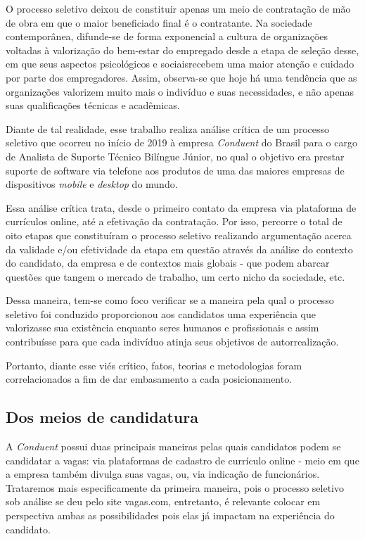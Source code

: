 \documentclass[12pt]{article}
\begin{document}
O processo seletivo deixou de constituir apenas um meio de contratação de mão de obra em que o maior beneficiado final é o contratante. Na sociedade contemporânea, difunde-se de forma exponencial a cultura de organizações voltadas à valorização do bem-estar do empregado desde a etapa de seleção desse, em que seus aspectos psicológicos e sociaisrecebem uma maior atenção e cuidado por parte dos empregadores. Assim, observa-se que hoje há uma tendência que as organizações valorizem muito mais o indivíduo e suas necessidades, e não apenas suas qualificações técnicas e acadêmicas.

Diante de tal realidade, esse trabalho realiza análise crítica de um processo seletivo que ocorreu no início de 2019 à empresa \emph{Conduent} do Brasil para o cargo de Analista de Suporte Técnico Bilíngue Júnior, no qual o objetivo era prestar suporte de software via telefone aos produtos de uma das maiores empresas de dispositivos \emph{mobile} e \emph{desktop} do mundo.

Essa análise crítica trata, desde o primeiro contato da empresa via plataforma de currículos online, até a efetivação da contratação. Por isso, percorre o total de oito etapas que constituíram o processo seletivo realizando argumentação acerca da validade e/ou efetividade da etapa em questão através da análise do contexto do candidato, da empresa e de contextos mais globais - que podem abarcar questões que tangem o mercado de trabalho, um certo nicho da sociedade, etc.

Dessa maneira, tem-se como foco verificar se a maneira pela qual o processo seletivo foi conduzido proporcionou aos candidatos uma experiência que valorizasse sua existência enquanto seres humanos e profissionais e assim contribuísse para que cada indivíduo atinja seus objetivos de autorrealização. 

Portanto, diante esse viés crítico, fatos, teorias e metodologias foram correlacionados a fim de dar embasamento a cada posicionamento.

\newpage



\subsection {Dos meios de candidatura}

A \emph {Conduent} possui duas principais maneiras pelas quais candidatos podem se candidatar a vagas: via plataformas de cadastro de currículo online - meio em que a empresa também divulga suas vagas, ou, via indicação de funcionários. Trataremos mais especificamente da primeira maneira, pois o processo seletivo sob análise se deu pelo site vagas.com, entretanto, é relevante colocar em perspectiva ambas as possibilidades pois elas já impactam na experiência do candidato. 
\end{document}
